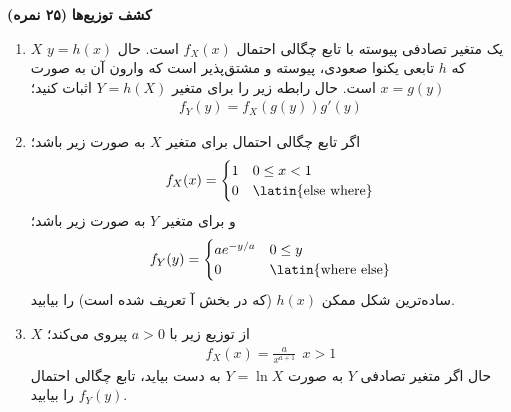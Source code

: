 \Large \textbf{کشف توزیع‌ها}
\large \textbf{(۲۵ نمره)}

\normalsize \vspace{0.5cm}

\begin{enumerate}[label=(\alph*)]
	\item

$X$ یک متغیر تصادفی پیوسته با تابع چگالی احتمال 
$f_X(x)$ است. 
حال 
$y=h(x)$ که 
$h$ تابعی یکنوا صعودی، پیوسته و مشتق‌پذیر است که وارون آن به صورت 
$x=g(y)$ است. حال رابطه زیر را برای متغیر 
$Y=h(X)$ اثبات کنید؛
\begin{gather*}
    f_Y(y)=f_X(g(y))g'(y)
\end{gather*}

	\item 


اگر تابع چگالی احتمال برای متغیر 
$X$ به صورت زیر باشد؛
\begin{gather*}
    f_X(x) =
  \begin{cases}
    \text{1}       & \text{0}\leq x <\text{1}\\
    \text{0}  & \text{\latin{else where}}
  \end{cases}
\end{gather*}
و برای متغیر 
$Y$ به صورت زیر باشد؛
\begin{gather*}
    f_Y(y) =
  \begin{cases}
    a e^{-y/a}      & \text{0}\leq y \\
    \text{0}  & \text{\latin{where else}}
  \end{cases}
\end{gather*}
ساده‌ترین شکل ممکن 
$h(x)$ (که در بخش آ تعریف شده است) را بیابید.


	\item
	
 
$X$ از توزیع زیر با 
$a>\text{0}$ پیروی می‌کند؛
\begin{gather*}
    f_X(x)=\frac{a}{x^{a+\text{1}}}\ \ x>\text{1}
\end{gather*}
حال اگر متغیر تصادفی 
$Y$ به صورت 
$Y=\ln X$ به دست بیاید، تابع چگالی احتمال 
$f_Y(y)$ را بیابید.



\end{enumerate}


